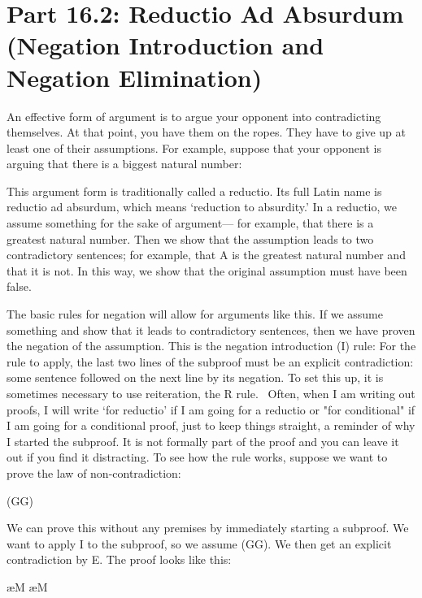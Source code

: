 \section{Part 16.2: Reductio Ad Absurdum (Negation Introduction and Negation Elimination)}
An effective form of argument is to argue your opponent into contradicting themselves. At that point, you have them on the ropes. They have to give up at least one of their assumptions. For example, suppose that your opponent is arguing that there is a biggest natural number:

This argument form is traditionally called a reductio. Its full Latin name is reductio ad absurdum, which means ‘reduction to absurdity.’ In a reductio, we assume something for the sake of argument— for example, that there is a greatest natural number. Then we show that the assumption leads to two contradictory sentences; for example, that A is the greatest natural number and that it is not. In this way, we show that the original assumption must have been false.

The basic rules for negation will allow for arguments like this. If we assume something and show that it leads to contradictory sentences, then we have proven the negation of the assumption. This is the negation introduction (\enot I) rule:
For the rule to apply, the last two lines of the subproof must be an explicit contradiction: some sentence followed on the next line by its negation. To set this up, it is sometimes necessary to use reiteration, the R rule.  Often, when I am writing out proofs, I will write ‘for reductio’ if I am going for a reductio or "for conditional" if I am going for a conditional proof, just to keep things straight, a reminder of why I started the subproof. It is not formally part of the proof and you can leave it out if you find it distracting. To see how the rule works, suppose we want to prove the law of non-contradiction:
\begin{center}
\enot (G\eand \enot G)
\end{center}
We can prove this without any premises by immediately starting a subproof. We want to apply \enot I to the subproof, so we assume (G\eand \enot G). We then get an explicit contradiction by \eand E. The proof looks like this:
\begin{fitchproof}
\open
	 \ae{M}
	 \ae{M}
\close
{} 
\end{fitchproof}

